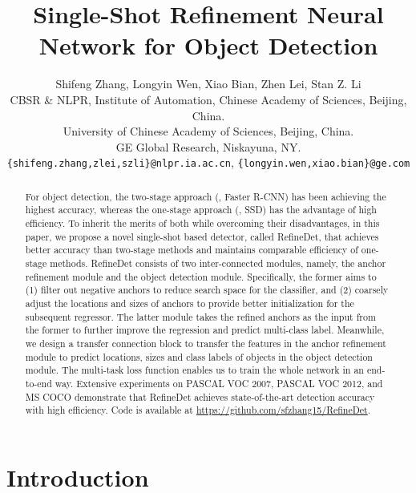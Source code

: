 \documentclass[10pt,twocolumn,letterpaper]{article}
\begin{document}
\title{Single-Shot Refinement Neural Network for Object Detection}

\author{Shifeng Zhang, Longyin Wen, Xiao Bian, Zhen Lei, Stan Z. Li\\
 CBSR \& NLPR, Institute of Automation, Chinese Academy of Sciences, Beijing, China. \\
 University of Chinese Academy of Sciences, Beijing, China. \\
 GE Global Research, Niskayuna, NY. \\
{\tt\small \{shifeng.zhang,zlei,szli\}@nlpr.ia.ac.cn}, {\tt \small \{longyin.wen,xiao.bian\}@ge.com}
}

\maketitle


\begin{abstract}

For object detection, the two-stage approach (\eg, Faster R-CNN) has been achieving the highest accuracy, whereas the one-stage approach (\eg, SSD) has the advantage of high efficiency. To inherit the merits of both while overcoming their disadvantages, in this paper, we propose a novel single-shot based detector, called RefineDet, that achieves better accuracy than two-stage methods and maintains comparable efficiency of one-stage methods. RefineDet consists of two inter-connected modules, namely, the anchor refinement module and the object detection module. Specifically, the former aims to (1) filter out negative anchors to reduce search space for the classifier, and (2) coarsely adjust the locations and sizes of anchors to provide better initialization for the subsequent regressor. The latter module takes the refined anchors as the input from the former to further improve the regression and predict multi-class label. Meanwhile, we design a transfer connection block to transfer the features in the anchor refinement module to predict locations, sizes and class labels of objects in the object detection module. The multi-task loss function enables us to train the whole network in an end-to-end way. Extensive experiments on PASCAL VOC 2007, PASCAL VOC 2012, and MS COCO demonstrate that RefineDet achieves state-of-the-art detection accuracy with high efficiency. Code is available at \url{https://github.com/sfzhang15/RefineDet}.

\end{abstract}

\section{Introduction}
\end{document}
